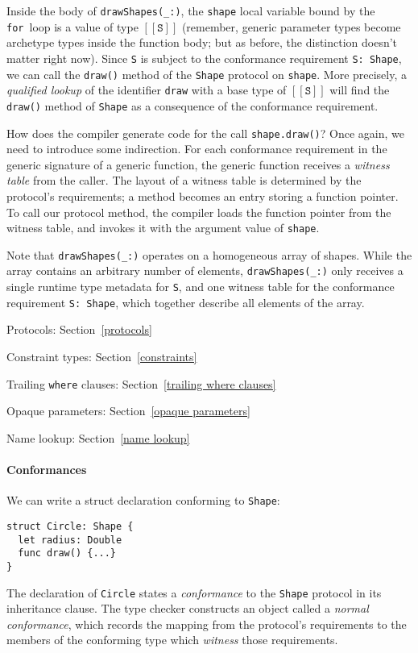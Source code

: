 \documentclass[a4paper,headsepline,bibliography=totoc,toc=flat,fleqn,twoside=semi]{scrbook}
\theoremstyle{definition}
\theoremstyle{definition}
\theoremstyle{definition}
\newcommand{\archetype}[1]{$[\![\texttt{#1}]\!]$}
\begin{document}
Inside the body of \verb|drawShapes(_:)|, the \texttt{shape} local variable bound by the \texttt{for}~loop is a value of type \archetype{S} (remember, generic parameter types become archetype types inside the function body; but as before, the distinction doesn't matter right now). Since \texttt{S} is subject to the conformance requirement \verb|S: Shape|, we can call the \texttt{draw()} method of the \texttt{Shape} protocol on \texttt{shape}. More precisely, a \emph{qualified lookup} of the identifier \texttt{draw} with a base type of \archetype{S} will find the \texttt{draw()} method of \texttt{Shape} as a consequence of the conformance requirement.

How does the compiler generate code for the call \verb|shape.draw()|? Once again, we need to introduce some indirection. For each conformance requirement in the generic signature of a generic function, the generic function receives a \emph{witness table} from the caller. The layout of a witness table is determined by the protocol's requirements; a method becomes an entry storing a function pointer. To call our protocol method, the compiler loads the function pointer from the witness table, and invokes it with the argument value of \texttt{shape}.

Note that \verb|drawShapes(_:)| operates on a homogeneous array of shapes. While the array contains an arbitrary number of elements, \verb|drawShapes(_:)| only receives a single runtime type metadata for \texttt{S}, and one witness table for the conformance requirement \verb|S: Shape|, which together describe all elements of the array.

\begin{MoreDetails}
\item Protocols: Section~\ref{protocols}
\item Constraint types: Section~\ref{constraints}
\item Trailing \texttt{where} clauses: Section~\ref{trailing where clauses}
\item Opaque parameters: Section~\ref{opaque parameters}
\item Name lookup: Section~\ref{name lookup}
\end{MoreDetails}

\paragraph{Conformances} We can write a struct declaration conforming to \texttt{Shape}:
\begin{Verbatim}
struct Circle: Shape {
  let radius: Double
  func draw() {...}
}
\end{Verbatim}
The declaration of \texttt{Circle} states a \emph{conformance} to the \texttt{Shape} protocol in its inheritance clause. The type checker constructs an object called a \emph{normal conformance}, which records the mapping from the protocol's requirements to the members of the conforming type which \emph{witness} those requirements.
\end{document}
